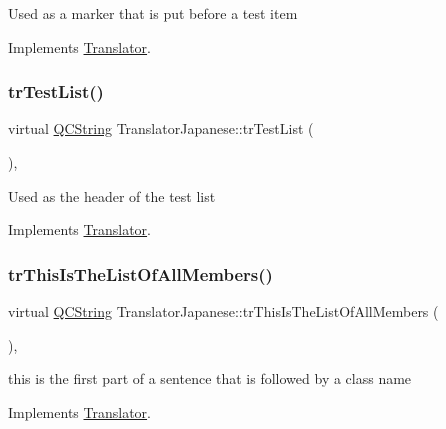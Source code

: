 Used as a marker that is put before a test item 

Implements \mbox{\hyperlink{class_translator}{Translator}}.

\mbox{\label{class_translator_japanese_a4df1657534bc411aabdc8e7edc399e5a}} 
\subsubsection{\texorpdfstring{trTestList()}{trTestList()}}
{\footnotesize\ttfamily virtual \mbox{\hyperlink{class_q_c_string}{Q\+C\+String}} Translator\+Japanese\+::tr\+Test\+List (\begin{DoxyParamCaption}{ }\end{DoxyParamCaption})\hspace{0.3cm}{\ttfamily [inline]}, {\ttfamily [virtual]}}

Used as the header of the test list 

Implements \mbox{\hyperlink{class_translator}{Translator}}.

\mbox{\label{class_translator_japanese_a45dd215136b1a871f08e1a238223622f}} 
\subsubsection{\texorpdfstring{trThisIsTheListOfAllMembers()}{trThisIsTheListOfAllMembers()}}
{\footnotesize\ttfamily virtual \mbox{\hyperlink{class_q_c_string}{Q\+C\+String}} Translator\+Japanese\+::tr\+This\+Is\+The\+List\+Of\+All\+Members (\begin{DoxyParamCaption}{ }\end{DoxyParamCaption})\hspace{0.3cm}{\ttfamily [inline]}, {\ttfamily [virtual]}}

this is the first part of a sentence that is followed by a class name 

Implements \mbox{\hyperlink{class_translator}{Translator}}.

\mbox{\label{class_translator_japanese_a2f3fd7761ecbcdb61c4279cfa42006d6}} 
